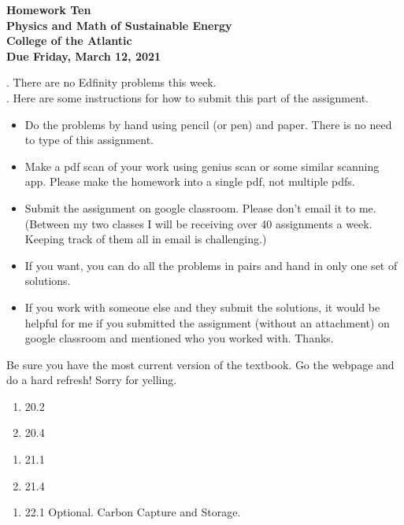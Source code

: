 \documentclass[12pt]{article}
\begin{document}
\pagestyle{empty}
 
\begin{center}
{\LARGE {\bf Homework Ten}}\\
\bigskip
{\Large {\bf Physics and Math of Sustainable Energy}}\\
\bigskip
{\Large {\bf College of the Atlantic}}\\
\bigskip
{ {\bf Due Friday, March 12, 2021}}\\ 
\end{center}
\medskip



. There are no Edfinity problems this
week.\\ 


.
Here are some 
instructions for how to submit this part of the assignment.
\begin{itemize}
\setlength{\itemsep}{0mm}
\item Do the problems by hand using pencil (or pen) and paper.
  There is no need to type of this assignment.
\item Make a pdf scan of your work using genius scan or some
  similar scanning app.  Please make the homework into a single
  pdf, not multiple pdfs. 
\item Submit the assignment on google classroom.  Please don't
  email it to me.  (Between my two classes I will be receiving
  over 40 assignments a week.  Keeping track of them all in email
  is challenging.)
\item If you want, you can do all the problems in pairs and hand
  in only one set of solutions.
\item If you work with someone else and they submit the solutions, it
  would be helpful for me if you submitted the assignment (without an
  attachment) on google classroom and mentioned who you worked with.
  Thanks. 

\end{itemize}


  Be sure you have the most
current version of the textbook.  Go the webpage and do a hard
refresh!  Sorry for yelling.\\ 


\begin{enumerate}
\setlength{\itemsep}{-1mm}
\item 20.2
\item 20.4
\end{enumerate}


\begin{enumerate}
\setlength{\itemsep}{-1mm}
\item 21.1
\item 21.4
\end{enumerate}


\begin{enumerate}
\setlength{\itemsep}{-1mm}
\item 22.1 Optional.  Carbon Capture and Storage.
\end{enumerate}
\end{document}
